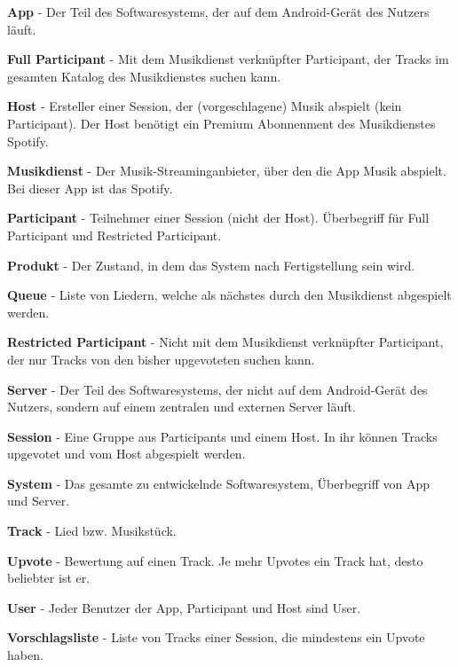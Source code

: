 \documentclass[oneside, ngerman]{sdqtechreport}
\begin{document}
\textbf{App}
 - Der Teil des Softwaresystems, der auf dem Android-Gerät des Nutzers läuft.

 \textbf{Full Participant}
 - Mit dem Musikdienst verknüpfter Participant, der Tracks im gesamten Katalog des Musikdienstes suchen kann.

\textbf{Host}
 - Ersteller einer Session, der (vorgeschlagene) Musik abspielt (kein Participant). Der Host benötigt ein Premium Abonnenment des Musikdienstes Spotify.

 \textbf{Musikdienst}
 - Der Musik-Streaminganbieter, über den die App Musik abspielt. Bei dieser App ist das Spotify.

 \textbf{Participant}
 - Teilnehmer einer Session (nicht der Host). Überbegriff für Full Participant und Restricted Participant.

 \textbf{Produkt}
 - Der Zustand, in dem das System nach Fertigstellung sein wird.

 \textbf{Queue}
 - Liste von Liedern, welche als nächstes durch den Musikdienst abgespielt werden.

 \textbf{Restricted Participant}
 - Nicht mit dem Musikdienst verknüpfter Participant, der nur Tracks von den bisher upgevoteten suchen kann.

 \textbf{Server}
 - Der Teil des Softwaresystems, der nicht auf dem Android-Gerät des Nutzers, sondern auf einem zentralen und externen Server läuft.

 \textbf{Session}
 - Eine Gruppe aus Participants und einem Host. In ihr können Tracks upgevotet und vom Host abgespielt werden.

\textbf{System}
 - Das gesamte zu entwickelnde Softwaresystem, Überbegriff von App und Server.

 \textbf{Track}
 - Lied bzw. Musikstück.

 \textbf{Upvote}
 - Bewertung auf einen Track. Je mehr Upvotes ein Track hat, desto beliebter ist er.

 \textbf{User}
 - Jeder Benutzer der App, Participant und Host sind User.

 \textbf{Vorschlagsliste}
 - Liste von Tracks einer Session, die mindestens ein Upvote haben.
 
\end{document}
